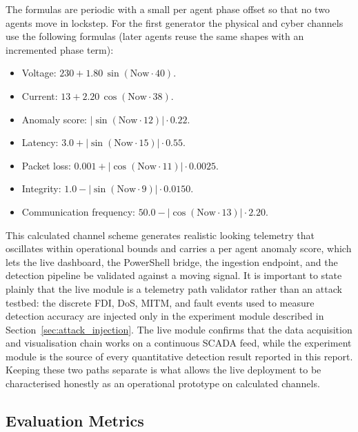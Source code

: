 \par \vspace{0.25cm}
\noindent
The formulas are periodic with a small per agent phase offset so that no two agents move in lockstep. For the first generator the physical and cyber channels use the following formulas (later agents reuse the same shapes with an incremented phase term):
\begin{itemize}
    \item Voltage: $230 + 1.80\,\sin(\text{Now}\cdot 40)$.
    \item Current: $13 + 2.20\,\cos(\text{Now}\cdot 38)$.
    \item Anomaly score: $|\sin(\text{Now}\cdot 12)|\cdot 0.22$.
    \item Latency: $3.0 + |\sin(\text{Now}\cdot 15)|\cdot 0.55$.
    \item Packet loss: $0.001 + |\cos(\text{Now}\cdot 11)|\cdot 0.0025$.
    \item Integrity: $1.0 - |\sin(\text{Now}\cdot 9)|\cdot 0.0150$.
    \item Communication frequency: $50.0 - |\cos(\text{Now}\cdot 13)|\cdot 2.20$.
\end{itemize}

\par \vspace{0.25cm}
\noindent
This calculated channel scheme generates realistic looking telemetry that oscillates within operational bounds and carries a per agent anomaly score, which lets the live dashboard, the PowerShell bridge, the ingestion endpoint, and the detection pipeline be validated against a moving signal. It is important to state plainly that the live module is a telemetry path validator rather than an attack testbed: the discrete FDI, DoS, MITM, and fault events used to measure detection accuracy are injected only in the experiment module described in Section~\ref{sec:attack_injection}. The live module confirms that the data acquisition and visualisation chain works on a continuous SCADA feed, while the experiment module is the source of every quantitative detection result reported in this report. Keeping these two paths separate is what allows the live deployment to be characterised honestly as an operational prototype on calculated channels.

\subsection{Evaluation Metrics}
\label{sec:eval_metrics}


